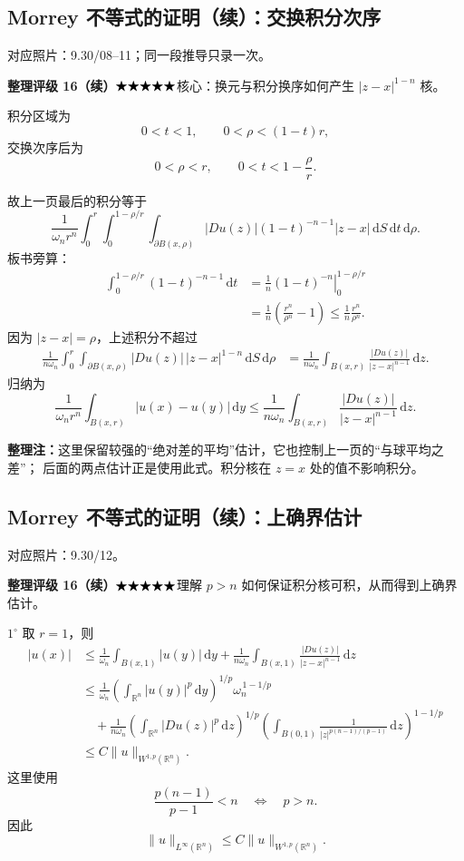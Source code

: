 \documentclass[UTF8,a4paper,11pt,fontset=fandol]{ctexart}
\newcommand{\R}{\mathbb R}
\newcommand{\dd}{\,\mathrm d}
\newcommand{\ednote}[1]{\par{\small\color{notegray}\textbf{整理注：}#1}\par}
\newcommand{\source}[1]{{\small\color{notegray}对应照片：#1。}\par}
\newcommand{\proofstars}[1]{\ensuremath{%
\ifnum#1>0\relax\bigstar\fi
\ifnum#1>1\relax\bigstar\fi
\ifnum#1>2\relax\bigstar\fi
\ifnum#1>3\relax\bigstar\fi
\ifnum#1>4\relax\bigstar\fi}}
\newcommand{\proofrating}[3]{\par{\small\color{proofblue}%
\textbf{整理评级 #1}\enspace\proofstars{#2}\quad #3\par}}
\begin{document}
\newpage
\subsection*{Morrey 不等式的证明（续）：交换积分次序}
\source{9.30/08--11；同一段推导只录一次}
\proofrating{16（续）}{5}{核心：换元与积分换序如何产生 $|z-x|^{1-n}$ 核。}
积分区域为
\[
0<t<1,\qquad 0<\rho<(1-t)r,
\]
交换次序后为
\[
0<\rho<r,\qquad 0<t<1-\frac{\rho}{r}.
\]
\begin{center}
\end{center}
故上一页最后的积分等于
\[
\frac1{\omega_n r^n}
\int_0^r\int_0^{1-\rho/r}\int_{\partial B(x,\rho)}
|Du(z)|(1-t)^{-n-1}|z-x|\dd S\dd t\dd\rho.
\]
板书旁算：
\[
\begin{aligned}
\int_0^{1-\rho/r}(1-t)^{-n-1}\dd t
&=\left.\frac1n(1-t)^{-n}\right|_0^{1-\rho/r}\\
&=\frac1n\left(\frac{r^n}{\rho^n}-1\right)
\leq\frac1n\frac{r^n}{\rho^n}.
\end{aligned}
\]
因为 $|z-x|=\rho$，上述积分不超过
\[
\begin{aligned}
\frac1{n\omega_n}\int_0^r\int_{\partial B(x,\rho)}
|Du(z)|\,|z-x|^{1-n}\dd S\dd\rho
&=\frac1{n\omega_n}\int_{B(x,r)}
\frac{|Du(z)|}{|z-x|^{n-1}}\dd z.
\end{aligned}
\]
归纳为
\[
\boxed{\frac1{\omega_n r^n}\int_{B(x,r)}|u(x)-u(y)|\dd y
\leq\frac1{n\omega_n}\int_{B(x,r)}
\frac{|Du(z)|}{|z-x|^{n-1}}\dd z.}
\]
\ednote{这里保留较强的“绝对差的平均”估计，它也控制上一页的“与球平均之差”；
后面的两点估计正是使用此式。积分核在 $z=x$ 处的值不影响积分。}


\newpage
\subsection*{Morrey 不等式的证明（续）：上确界估计}
\source{9.30/12}
\proofrating{16（续）}{5}{理解 $p>n$ 如何保证积分核可积，从而得到上确界估计。}
$1^\circ$ 取 $r=1$，则
\[
\begin{aligned}
|u(x)|
&\leq\frac1{\omega_n}\int_{B(x,1)}|u(y)|\dd y
+\frac1{n\omega_n}\int_{B(x,1)}
\frac{|Du(z)|}{|z-x|^{n-1}}\dd z\\
&\leq\frac1{\omega_n}
\left(\int_{\R^n}|u(y)|^p\dd y\right)^{1/p}\omega_n^{\,1-1/p}\\
&\quad+\frac1{n\omega_n}
\left(\int_{\R^n}|Du(z)|^p\dd z\right)^{1/p}
\left(\int_{B(0,1)}\frac1{|z|^{p(n-1)/(p-1)}}\dd z\right)^{1-1/p}\\
&\leq C\|u\|_{W^{1,p}(\R^n)}.
\end{aligned}
\]
这里使用
\[
\frac{p(n-1)}{p-1}<n\quad\Longleftrightarrow\quad p>n.
\]
因此
\[
\|u\|_{L^\infty(\R^n)}
\leq C\|u\|_{W^{1,p}(\R^n)}.
\]
\end{document}
